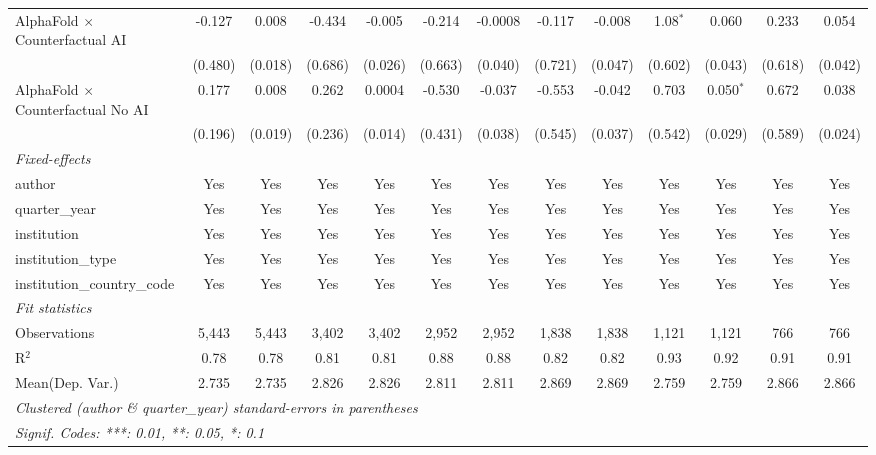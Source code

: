 \begin{tabular}{lcccccccccccc}
   AlphaFold $\times$ Counterfactual AI     & -0.127  & 0.008   & -0.434  & -0.005  & -0.214  & -0.0008 & -0.117  & -0.008  & 1.08$^{*}$   & 0.060       & 0.233   & 0.054\\   
                                            & (0.480) & (0.018) & (0.686) & (0.026) & (0.663) & (0.040) & (0.721) & (0.047) & (0.602)      & (0.043)     & (0.618) & (0.042)\\   
   AlphaFold $\times$ Counterfactual No AI  & 0.177   & 0.008   & 0.262   & 0.0004  & -0.530  & -0.037  & -0.553  & -0.042  & 0.703        & 0.050$^{*}$ & 0.672   & 0.038\\   
                                            & (0.196) & (0.019) & (0.236) & (0.014) & (0.431) & (0.038) & (0.545) & (0.037) & (0.542)      & (0.029)     & (0.589) & (0.024)\\   
   \midrule
   \emph{Fixed-effects}\\
   author                                   & Yes     & Yes     & Yes     & Yes     & Yes     & Yes     & Yes     & Yes     & Yes          & Yes         & Yes     & Yes\\  
   quarter\_year                            & Yes     & Yes     & Yes     & Yes     & Yes     & Yes     & Yes     & Yes     & Yes          & Yes         & Yes     & Yes\\  
   institution                              & Yes     & Yes     & Yes     & Yes     & Yes     & Yes     & Yes     & Yes     & Yes          & Yes         & Yes     & Yes\\  
   institution\_type                        & Yes     & Yes     & Yes     & Yes     & Yes     & Yes     & Yes     & Yes     & Yes          & Yes         & Yes     & Yes\\  
   institution\_country\_code               & Yes     & Yes     & Yes     & Yes     & Yes     & Yes     & Yes     & Yes     & Yes          & Yes         & Yes     & Yes\\  
   \midrule
   \emph{Fit statistics}\\
   Observations                             & 5,443   & 5,443   & 3,402   & 3,402   & 2,952   & 2,952   & 1,838   & 1,838   & 1,121        & 1,121       & 766     & 766\\  
   R$^2$                                    & 0.78    & 0.78    & 0.81    & 0.81    & 0.88    & 0.88    & 0.82    & 0.82    & 0.93         & 0.92        & 0.91    & 0.91\\  
Mean(Dep. Var.) & 2.735 & 2.735 & 2.826 & 2.826 & 2.811 & 2.811 & 2.869 & 2.869 & 2.759 & 2.759 & 2.866 & 2.866 \\
   \midrule \midrule
   \multicolumn{13}{l}{\emph{Clustered (author \& quarter\_year) standard-errors in parentheses}}\\
   \multicolumn{13}{l}{\emph{Signif. Codes: ***: 0.01, **: 0.05, *: 0.1}}\\
\end{tabular}
\par\endgroup
